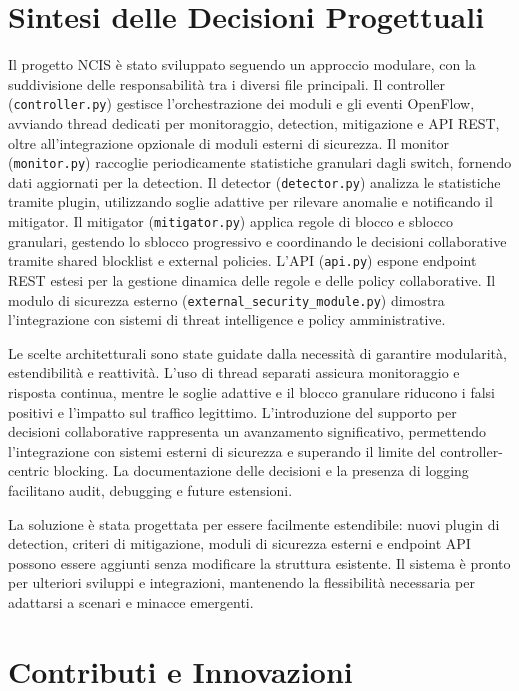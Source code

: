 \section{Sintesi delle Decisioni Progettuali}

Il progetto NCIS è stato sviluppato seguendo un approccio modulare, con la suddivisione delle responsabilità tra i diversi file principali. Il controller (\texttt{controller.py}) gestisce l'orchestrazione dei moduli e gli eventi OpenFlow, avviando thread dedicati per monitoraggio, detection, mitigazione e API REST, oltre all'integrazione opzionale di moduli esterni di sicurezza. Il monitor (\texttt{monitor.py}) raccoglie periodicamente statistiche granulari dagli switch, fornendo dati aggiornati per la detection. Il detector (\texttt{detector.py}) analizza le statistiche tramite plugin, utilizzando soglie adattive per rilevare anomalie e notificando il mitigator. Il mitigator (\texttt{mitigator.py}) applica regole di blocco e sblocco granulari, gestendo lo sblocco progressivo e coordinando le decisioni collaborative tramite shared blocklist e external policies. L'API (\texttt{api.py}) espone endpoint REST estesi per la gestione dinamica delle regole e delle policy collaborative. Il modulo di sicurezza esterno (\texttt{external\_security\_module.py}) dimostra l'integrazione con sistemi di threat intelligence e policy amministrative.

Le scelte architetturali sono state guidate dalla necessità di garantire modularità, estendibilità e reattività. L'uso di thread separati assicura monitoraggio e risposta continua, mentre le soglie adattive e il blocco granulare riducono i falsi positivi e l'impatto sul traffico legittimo. L'introduzione del supporto per decisioni collaborative rappresenta un avanzamento significativo, permettendo l'integrazione con sistemi esterni di sicurezza e superando il limite del controller-centric blocking. La documentazione delle decisioni e la presenza di logging facilitano audit, debugging e future estensioni.

La soluzione è stata progettata per essere facilmente estendibile: nuovi plugin di detection, criteri di mitigazione, moduli di sicurezza esterni e endpoint API possono essere aggiunti senza modificare la struttura esistente. Il sistema è pronto per ulteriori sviluppi e integrazioni, mantenendo la flessibilità necessaria per adattarsi a scenari e minacce emergenti.

\section{Contributi e Innovazioni}

